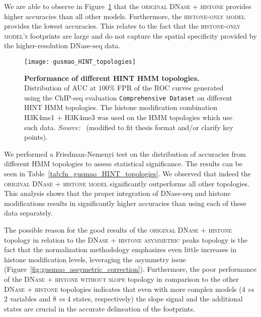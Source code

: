 We are able to observe in Figure~\ref{fig:gusmao_HINT_topologies} that the \textsc{original DNase + histone} provides higher accuracies than all other models. Furthermore, the \textsc{histone-only model} provides the lowest accuracies. This relates to the fact that the \textsc{histone-only model's} footprints are large and do not capture the spatial specificity provided by the higher-resolution DNase-seq data.

\begin{figure}[h!]
\centering
\texttt{[image: gusmao\_HINT\_topologies]}
\caption[Performance of different HINT HMM topologies]{\textbf{Performance of different HINT HMM topologies.} Distribution of AUC at $100\%$ FPR of the ROC curves generated using the ChIP-seq evaluation {\tt Comprehensive Dataset} on different HINT HMM topologies. The histone modification combination H3K4me1 $+$ H3K4me3 was used on the HMM topologies which use such data. \emph{Source:~\cite{gusmao2014}} (modified to fit thesis format and/or clarify key points).}
\label{fig:gusmao_HINT_topologies}
\end{figure}

We performed a Friedman-Nemenyi test on the distribution of accuracies from different HMM topologies to assess statistical significance. The results can be seen in Table~\ref{tab:fn_gusmao_HINT_topologies}. We observed that indeed the \textsc{original DNase + histone model} significantly outperforms all other topologies. This analysis shows that the proper integration of DNase-seq and histone modifications results in significantly higher accuracies than using each of these data separately.

The possible reason for the good results of the \textsc{original DNase + histone} topology in relation to the \textsc{DNase + histone asymmetric} peaks topology is the fact that the normalization methodology emphasizes even little increases in histone modification levels, leveraging the asymmetry issue (Figure~\ref{fig:gusmao_assymetric_correction}). Furthermore, the poor performance of the \textsc{DNase + histone without slope} topology in comparison to the other \textsc{DNase + histone} topologies indicates that even with more complex models ($4$ \emph{vs} $2$ variables and $8$ \emph{vs} $4$ states, respectively) the slope signal and the additional states are crucial in the accurate delineation of the footprints.

